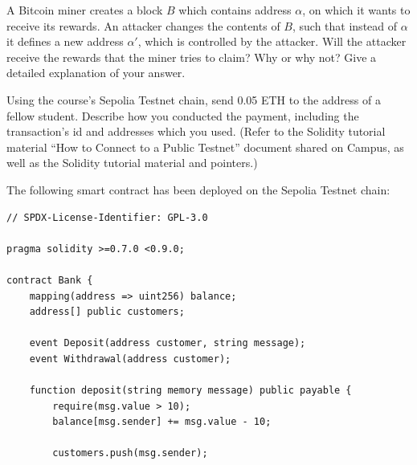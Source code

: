 \documentclass[12pt,addpoints,answers]{exam}
\begin{document}
\begin{questions}
    

\newpage

\question[10] A Bitcoin miner creates a block $B$ which contains address $\alpha$, on which it wants to receive its rewards. An attacker changes the contents of $B$, such that instead of $\alpha$ it defines a new address $\alpha'$, which is controlled by the attacker. Will the attacker receive the rewards that the miner tries to claim? Why or why not? Give a detailed explanation of your answer.

    

\newpage

\question[10] Using the course’s Sepolia  Testnet chain, send 0.05 ETH to the address of a fellow student. Describe how you conducted the payment, including the transaction’s id and addresses which you used. (Refer to the Solidity tutorial material “How to Connect
to a Public Testnet” document shared on Campus, as well as the Solidity
tutorial material and pointers.) 

    

\newpage
  
\question The following smart contract has been deployed on the Sepolia Testnet chain:

{\footnotesize

\begin{verbatim}
// SPDX-License-Identifier: GPL-3.0

pragma solidity >=0.7.0 <0.9.0;

contract Bank {
    mapping(address => uint256) balance;
    address[] public customers;

    event Deposit(address customer, string message);
    event Withdrawal(address customer);

    function deposit(string memory message) public payable {
        require(msg.value > 10);
        balance[msg.sender] += msg.value - 10;

        customers.push(msg.sender);


\end{verbatim}}
\end{questions}
\end{document}

